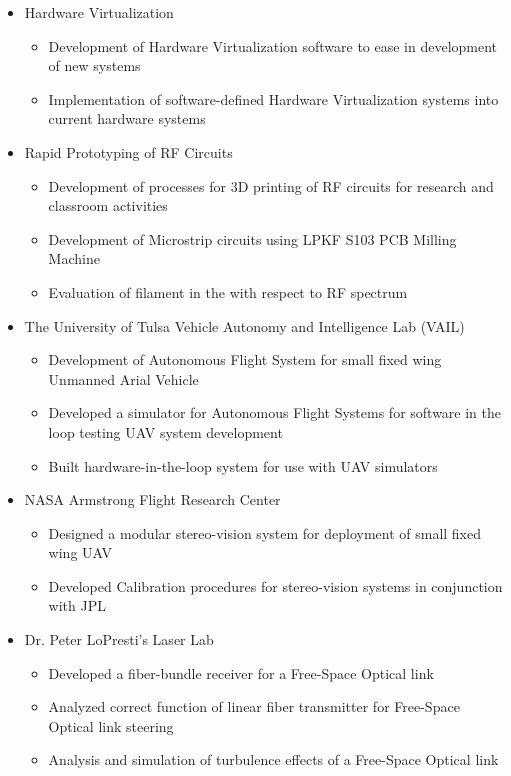 \documentclass[line]{res} %
\begin{document}
\begin{resume}
\begin{itemize}
\item Hardware Virtualization
\begin{itemize}
\item Development of Hardware Virtualization software to ease in development of new systems
\item Implementation of software-defined Hardware Virtualization systems into current hardware systems
\end{itemize}
\item Rapid Prototyping of RF Circuits
\begin{itemize}
\item Development of processes for 3D printing of RF circuits for research and classroom activities
\item Development of Microstrip circuits using LPKF S103 PCB Milling Machine
\item Evaluation of filament in the with respect to RF spectrum
\end{itemize}
\item The University of Tulsa Vehicle Autonomy and Intelligence Lab (VAIL)
\begin{itemize}
\item Development of Autonomous Flight System for small fixed wing Unmanned Arial Vehicle
\item Developed a simulator for Autonomous Flight Systems for software in the loop testing UAV system development
\item Built hardware-in-the-loop system for use with UAV simulators
\end{itemize}
\item NASA Armstrong Flight Research Center
\begin{itemize}
\item Designed a modular stereo-vision system for deployment of small fixed wing UAV
\item Developed Calibration procedures for stereo-vision systems in conjunction with JPL
\end{itemize}
\item Dr. Peter LoPresti’s Laser Lab
\begin{itemize}
\item Developed a fiber-bundle receiver for a Free-Space Optical link
\item Analyzed correct function of linear fiber transmitter for Free-Space Optical link steering
\item Analysis and simulation of turbulence effects of a Free-Space Optical link
\end{itemize}
\end{itemize}


\end{resume}
\end{document}
